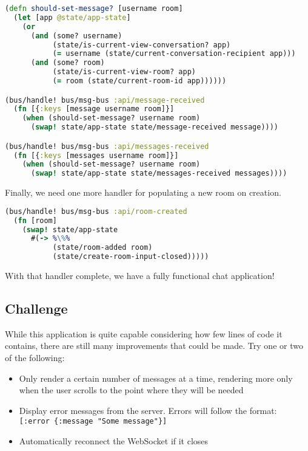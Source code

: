 \documentclass[10pt,twoside,openright]{memoir}
\begin{document}
\begin{lstlisting}[language=Clojure]
(defn should-set-message? [username room]
  (let [app @state/app-state]
    (or
      (and (some? username)
           (state/is-current-view-conversation? app)
           (= username (state/current-conversation-recipient app)))
      (and (some? room)
           (state/is-current-view-room? app)
           (= room (state/current-room-id app))))))

(bus/handle! bus/msg-bus :api/message-received
  (fn [{:keys [message username room]}]
    (when (should-set-message? username room)
      (swap! state/app-state state/message-received message))))

(bus/handle! bus/msg-bus :api/messages-received
  (fn [{:keys [messages username room]}]
    (when (should-set-message? username room)
      (swap! state/app-state state/messages-received messages))))
\end{lstlisting}

Finally, we need one more handler for populating a new room on creation.

\begin{lstlisting}[language=Clojure]
(bus/handle! bus/msg-bus :api/room-created
  (fn [room]
    (swap! state/app-state
      #(-> %\%%
           (state/room-added room)
           (state/create-room-input-closed)))))
\end{lstlisting}

With that handler complete, we have a fully functional chat application!


\subsection{Challenge}

While this application is quite capable considering how few lines of
code it contains, there are still many improvements that could be made.
Try one or two of the following:

\begin{itemize}
\tightlist
\item
  Only render a certain number of messages at a time, rendering more
  only when the user scrolls to the point where they will be needed
\item
  Display error messages from the server. Errors will follow the format:
  \texttt{{[}:error\ \{:message\ "Some\ message"\}{]}}
\item
  Automatically reconnect the WebSocket if it closes
\end{itemize}
\end{document}
